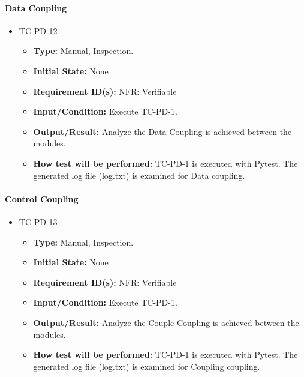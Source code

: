 \documentclass[12pt, titlepage]{article}
\begin{document}
\paragraph{Data Coupling}
\begin{itemize}
\item{TC-PD-12\\}
\begin{itemize}
\item{\textbf{Type:}} Manual, Inspection.
					
\item{\textbf{Initial State:}} None

\item{\textbf{Requirement ID(s):}} NFR: Verifiable
					
\item{\textbf{Input/Condition:}}  Execute TC-PD-1. 
					
\item{\textbf{Output/Result:}} Analyze the Data Coupling is achieved between the modules.

\item{\textbf{How test will be performed:}}  TC-PD-1 is executed with Pytest. The generated log file (log.txt)
is examined for Data coupling.
\end{itemize}
\end{itemize}

\paragraph{Control Coupling}
\begin{itemize}
\item{TC-PD-13\\}
\begin{itemize}
\item{\textbf{Type:}} Manual, Inspection.
					
\item{\textbf{Initial State:}} None

\item{\textbf{Requirement ID(s):}} NFR: Verifiable
					
\item{\textbf{Input/Condition:}}  Execute TC-PD-1. 
					
\item{\textbf{Output/Result:}} Analyze the Couple Coupling is achieved between the modules.

\item{\textbf{How test will be performed:}}  TC-PD-1 is executed with Pytest. The generated log file (log.txt)
is examined for Coupling coupling.
\end{itemize}
\end{itemize}
\end{document}

